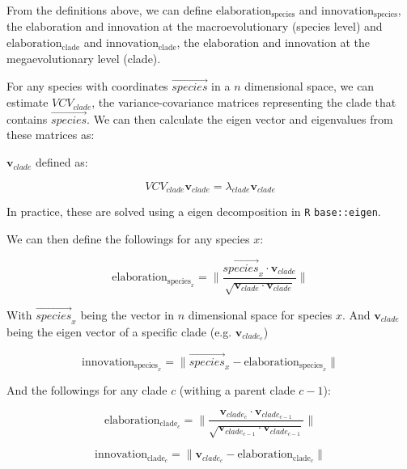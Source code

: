 \documentclass[12pt,a4paper]{article}
\begin{document}
From the definitions above, we can define $\text{elaboration}_{\text{species}}$ and $\text{innovation}_{\text{species}}$, the elaboration and innovation at the macroevolutionary (species level) and $\text{elaboration}_{\text{clade}}$ and $\text{innovation}_{\text{clade}}$, the elaboration and innovation at the megaevolutionary level (clade).

For any species with coordinates $\vec{species}$ in a $n$ dimensional space, we can estimate $VCV_{clade}$, the variance-covariance matrices representing the clade that contains $\vec{species}$.
We can then calculate the eigen vector and eigenvalues from these matrices as: 

$\textbf{v}_{clade}$ defined as:

\begin{equation}
VCV_{clade} \textbf{v}_{clade} = \lambda_{clade} \textbf{v}_{clade}
\end{equation}

In practice, these are solved using a eigen decomposition in \texttt{R} \texttt{base::eigen}.

We can then define the followings for any species $x$:

\begin{equation}
\text{elaboration}_{\text{species}_{x}} = \|\frac{\vec{species}_{x} \cdot \textbf{v}_{clade}} {\sqrt{\textbf{v}_{clade} \cdot \textbf{v}_{clade}}}\|
\end{equation}

With $\vec{species}_{x}$ being the vector in $n$ dimensional space for species $x$. And $\textbf{v}_{clade}$ being the eigen vector of a specific clade (e.g. $\textbf{v}_{clade_{c}}$)

\begin{equation}
\text{innovation}_{\text{species}_{x}} = \| \vec{species}_{x} - \text{elaboration}_{\text{species}_{x}} \|
\end{equation}

And the followings for any clade $c$ (withing a parent clade $c-1$):

\begin{equation}
\text{elaboration}_{\text{clade}_{c}} = \| \frac{\textbf{v}_{clade_{c}} \cdot \textbf{v}_{clade_{c-1}}} {\sqrt{\textbf{v}_{clade_{c-1}} \cdot \textbf{v}_{clade_{c-1}}}}\|
\end{equation}

\begin{equation}
\text{innovation}_{\text{clade}_{c}} = \| \textbf{v}_{clade_{c}} - \text{elaboration}_{\text{clade}_{c}} \|
\end{equation}
\end{document}
